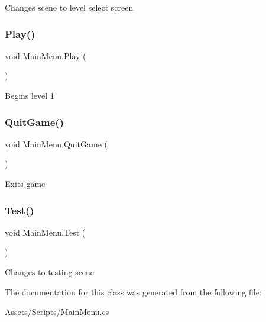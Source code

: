 Changes scene to level select screen \mbox{\label{class_main_menu_a18b84d06aaaeb1086349846809d31ab3}} 
\subsubsection{\texorpdfstring{Play()}{Play()}}
{\footnotesize\ttfamily void Main\+Menu.\+Play (\begin{DoxyParamCaption}{ }\end{DoxyParamCaption})\hspace{0.3cm}{\ttfamily [inline]}}

Begins level 1 \mbox{\label{class_main_menu_a485db7cf60c0b93ecc87b9273bcce78b}} 
\subsubsection{\texorpdfstring{Quit\+Game()}{QuitGame()}}
{\footnotesize\ttfamily void Main\+Menu.\+Quit\+Game (\begin{DoxyParamCaption}{ }\end{DoxyParamCaption})\hspace{0.3cm}{\ttfamily [inline]}}

Exits game \mbox{\label{class_main_menu_a8c08f64fe9eb1b70fb787c0215bd1023}} 
\subsubsection{\texorpdfstring{Test()}{Test()}}
{\footnotesize\ttfamily void Main\+Menu.\+Test (\begin{DoxyParamCaption}{ }\end{DoxyParamCaption})\hspace{0.3cm}{\ttfamily [inline]}}

Changes to testing scene 

The documentation for this class was generated from the following file\+:\begin{DoxyCompactItemize}
\item 
Assets/\+Scripts/Main\+Menu.\+cs\end{DoxyCompactItemize}

